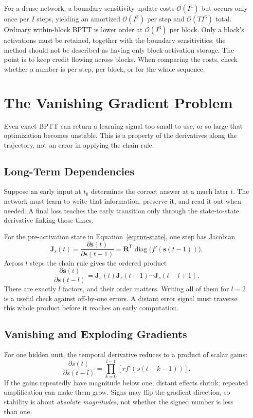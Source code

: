 \documentclass[11pt, oneside]{book}
\newcommand{\T}{^{\mathsf{T}}}           %
\newcommand{\diag}{\operatorname{diag}}
\newcommand{\bigO}[1]{\mathcal{O}\!\left(#1\right)}
\let\originalsection\section
\renewcommand{\section}{\Needspace{7\baselineskip}\originalsection}
\let\originalsubsection\subsection
\renewcommand{\subsection}{\Needspace{6\baselineskip}\originalsubsection}
\begin{document}
For a dense network, a boundary sensitivity update costs $\bigO{I^4}$ but occurs only once per $I$ steps, yielding an amortized $\bigO{I^3}$ per step and $\bigO{TI^3}$ total. Ordinary within-block BPTT is lower order at $\bigO{I^3}$ per block. Only a block's activations must be retained, together with the boundary sensitivities; the method should not be described as having only block-activation storage. The point is to keep credit flowing across blocks. When comparing the costs, check whether a number is per step, per block, or for the whole sequence.

\section{The Vanishing Gradient Problem}\label{sec:source-2-5}
Even exact BPTT can return a learning signal too small to use, or so large that optimization becomes unstable. This is a property of the derivatives along the trajectory, not an error in applying the chain rule.

\subsection{Long-Term Dependencies}\label{sec:source-2-5-1}
Suppose an early input at $t_0$ determines the correct answer at a much later $t$. The network must learn to write that information, preserve it, and read it out when needed. A final loss teaches the early transition only through the state-to-state derivative linking those times.

For the pre-activation state in Equation~\eqref{eq:rnn-state}, one step has Jacobian
\[
 \mathbf{J}_s(t)=\frac{\partial\mathbf{s}(t)}{\partial\mathbf{s}(t-1)}
  =\mathbf{R}\T\diag\!\bigl(f'(\mathbf{s}(t-1))\bigr).
\]
Across $l$ steps the chain rule gives the ordered product
\begin{equation}
 \frac{\partial\mathbf{s}(t)}{\partial\mathbf{s}(t-l)}
  =\mathbf{J}_s(t)\mathbf{J}_s(t-1)\cdots\mathbf{J}_s(t-l+1).
 \label{eq:jacobian-chain}
\end{equation}
There are exactly $l$ factors, and their order matters. Writing all of them for $l=2$ is a useful check against off-by-one errors. A distant error signal must traverse this whole product before it reaches an early computation.

\subsection{Vanishing and Exploding Gradients}\label{sec:source-2-5-2}
For one hidden unit, the temporal derivative reduces to a product of scalar gains:
\[
 \frac{\partial s(t)}{\partial s(t-l)}
 =\prod_{k=0}^{l-1}\left[r f'(s(t-k-1))\right].
\]
If the gains repeatedly have magnitude below one, distant effects shrink; repeated amplification can make them grow. Signs may flip the gradient direction, so stability is about \emph{absolute magnitudes}, not whether the signed number is less than one.
\end{document}
